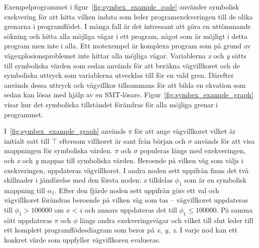 Exempelprogrammet i figur~\ref{fig:symbex_example_code} använder symbolisk
exekvering för att hitta vilken indata som leder programexekveringen till de
olika grenarna i programflödet. I många fall är det intressant att göra en
uttömmande sökning och hitta alla möjliga vägar i ett program, något som är
möjligt i detta program men inte i alla. Ett motexempel är komplexa
program som på grund av vägexplosionsproblemet inte hittar alla möjliga vägar.
Variablerna \emph{x} och \emph{y} sätts till symboliska värden som sedan används
för att beräkna vägvillkoret och de symboliska uttryck som variablerna utvecklas
till för en vald gren. Därefter används dessa uttryck och vägvillkor 
tillsammans för att bilda en ekvation som sedan kan lösas med hjälp av en SMT-lösare.
Figur~\ref{fig:symbex_example_graph} visar
hur det symboliska tillståndet förändras för alla möjliga grenar i programmet.

I~\ref{fig:symbex_example_graph} används $\pi$ för att ange vägvillkoret vilket
är initialt satt till $\top$ eftersom villkoret är sant från början och $\sigma$
används för att visa mappningen för symboliska värden. $\pi$ och $\sigma$ %
populeras längs med exekveringen, och \emph{x} och \emph{y} mappas till
symboliska värden. Beroende på vilken väg som väljs i exekveringen, uppdateras
vägvillkoret. I andra noden sett uppifrån finns det två skillnader i jämförelse
med den första noden: \emph{x} tilldelas $\phi_1$ som är en symbolisk mappning
till $\alpha_1$. Efter den fjärde noden sett uppifrån görs ett val och
vägvillkoret förändras beroende på vilken väg som tas -- vägvillkoret uppdateras
till $\phi_1 > 100000$ om $x < z$ och annars uppdateras det till $\phi_1 \leq 
    100000$. På samma sätt uppdateras $\pi$ och $\phi$ längs andra exekveringsvägar
och vilket till slut leder till ett komplett programflödesdiagram som beror på
\emph{x, y, z}. I varje nod kan ett konkret värde som uppfyller vägvillkoren evalueras.

